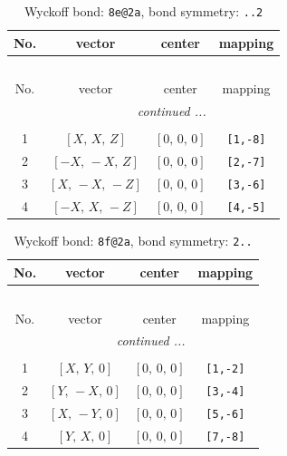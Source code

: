 \documentclass[fleqn,8pt]{jsarticle}
\begin{document}
\renewcommand{\arraystretch}{1.2}
\begin{longtable}{cccc}
\caption{Wyckoff bond: {\tt 8e@2a}, bond symmetry: {\tt ..2}}
 \\
 \hline \hline
No. & vector & center & mapping \\ \hline \endfirsthead

\multicolumn{3}{l}{\tablename\ \thetable{}} \\
 \hline \hline
No. & vector & center & mapping \\ \hline \endhead

 \hline \hline
\multicolumn{3}{r}{\footnotesize\it continued ...} \\ \endfoot

 \hline \hline
\multicolumn{3}{r}{} \\ \endlastfoot

1 & $\left[ X,\, X,\, Z \right]$ & $\left[ 0,\, 0,\, 0 \right]$ & {\tt [1,-8]} \\ \hline
2 & $\left[ - X,\, - X,\, Z \right]$ & $\left[ 0,\, 0,\, 0 \right]$ & {\tt [2,-7]} \\ \hline
3 & $\left[ X,\, - X,\, - Z \right]$ & $\left[ 0,\, 0,\, 0 \right]$ & {\tt [3,-6]} \\ \hline
4 & $\left[ - X,\, X,\, - Z \right]$ & $\left[ 0,\, 0,\, 0 \right]$ & {\tt [4,-5]} \\
\end{longtable}
\renewcommand{\arraystretch}{1.2}
\begin{longtable}{cccc}
\caption{Wyckoff bond: {\tt 8f@2a}, bond symmetry: {\tt 2..}}
 \\
 \hline \hline
No. & vector & center & mapping \\ \hline \endfirsthead

\multicolumn{3}{l}{\tablename\ \thetable{}} \\
 \hline \hline
No. & vector & center & mapping \\ \hline \endhead

 \hline \hline
\multicolumn{3}{r}{\footnotesize\it continued ...} \\ \endfoot

 \hline \hline
\multicolumn{3}{r}{} \\ \endlastfoot

1 & $\left[ X,\, Y,\, 0 \right]$ & $\left[ 0,\, 0,\, 0 \right]$ & {\tt [1,-2]} \\ \hline
2 & $\left[ Y,\, - X,\, 0 \right]$ & $\left[ 0,\, 0,\, 0 \right]$ & {\tt [3,-4]} \\ \hline
3 & $\left[ X,\, - Y,\, 0 \right]$ & $\left[ 0,\, 0,\, 0 \right]$ & {\tt [5,-6]} \\ \hline
4 & $\left[ Y,\, X,\, 0 \right]$ & $\left[ 0,\, 0,\, 0 \right]$ & {\tt [7,-8]} \\
\end{longtable}
\end{document}

